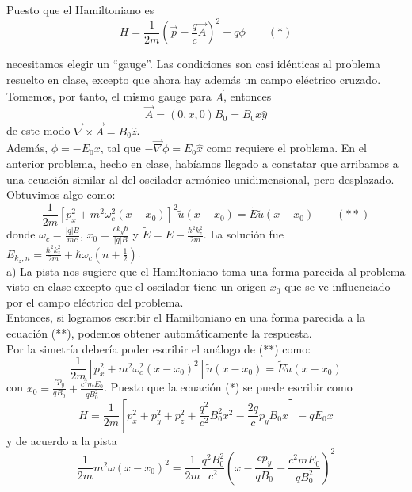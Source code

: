 \begin{solution}
Puesto que el Hamiltoniano es
\begin{equation*}
H=\frac{1}{2m}\left( \vec{p}-\frac{q}{c}\vec{A}\right)^{2}+q\phi    \qquad (*)
\end{equation*}

necesitamos elegir un ``gauge''. Las condiciones son casi idénticas al problema resuelto en clase, excepto que ahora hay además un campo eléctrico cruzado. Tomemos, por tanto, el mismo gauge para $\vec{A}$, entonces
\begin{equation*}
\vec{A}=(0, x, 0)B_0=B_0x\hat{y}
\end{equation*}
de este modo $\vec{\nabla}\times\vec{A}=B_0\hat{z}$.\\

Además, $\phi=-E_0x$, tal que  $-\vec{\nabla}\phi=E_0\hat{x}$ como requiere el problema.
En el anterior problema, hecho en clase, habíamos llegado a constatar que arribamos a una ecuación similar al del oscilador armónico unidimensional, pero desplazado. Obtuvimos algo como:
\begin{equation*}
\frac{1}{2m}\left[ p_x^{2}+m^{2}\omega_c^{2}(x-x_0)\right]^2\tilde{u}(x-x_0)=\tilde{E}\tilde{u}(x-x_0) \qquad (**)
\end{equation*}
donde $\omega_c=\frac{ \left | q \right |B}{mc}$, $x_0=\frac{ck_y\hbar}{ \left | q \right |B}$ y $\tilde{E}=E-\frac{\hbar^{2}k_z^2}{2m}$. La solución fue $E_{k_z,n}=\frac{\hbar^{2}k_z^{2}}{2m}+\hbar\omega_c(n+\frac{1}{2})$.\\

a) La pista nos sugiere que el Hamiltoniano toma una forma parecida al problema visto en clase excepto que el oscilador tiene un origen $x_0$ que se ve influenciado por el campo eléctrico del problema.\\

Entonces, si logramos escribir el Hamiltoniano en una forma parecida a la ecuación (**), podemos obtener automáticamente la respuesta.\\
 
Por la simetría debería poder escribir el análogo de (**) como:
\begin{equation*}
\frac{1}{2m}[p_x^{2}+m^{2}\omega_c^{2}(x-x_0)^{2}]\tilde{u}(x-x_0)=\tilde{E}\tilde{u}(x-x_0)
\end{equation*}
con $x_0=\frac{cp_y}{qB_0}+\frac{c^{2}mE_0}{qB_0^{2}}$.
Puesto que la ecuación (*) se puede escribir como
\begin{equation*}
H=\frac{1}{2m}\left[ p_x^{2}+p_y^{2}+p_z^{2}+\frac{q^{2}}{c^2}B_0^{2}x^{2}-\frac{2q}{c}p_yB_0x\right] -qE_0x
\end{equation*}
y de acuerdo a la pista
\begin{equation*}
\frac{1}{2m} m^2\omega(x-x_0)^2=\frac{1}{2m}\frac{q^2B_0^2}{c^2}\left( x-\frac{cp_y}{qB_0}-\frac{c^2mE_0}{qB_0^2}\right)^2
\end{equation*}


\end{solution}
